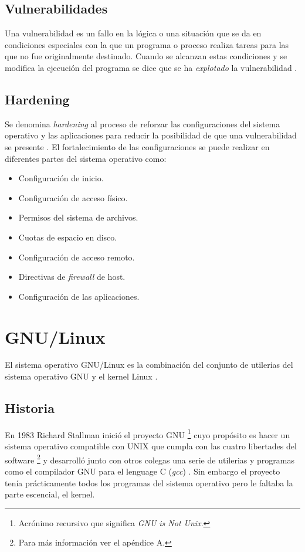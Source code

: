   \subsection {Vulnerabilidades}

Una vulnerabilidad es un fallo en la l\'{o}gica o una situaci\'{o}n que se da en condiciones especiales con la que un programa o proceso realiza tareas para las que no fue originalmente destinado. Cuando se alcanzan estas condiciones y se modifica la ejecuci\'{o}n del programa se dice que se ha \textit{explotado} la vulnerabilidad \cite{padilla_buenas_2009}.

  \subsection {Hardening}

Se denomina \textit{hardening} al proceso de reforzar las configuraciones del sistema operativo y las aplicaciones para reducir la posibilidad de que una vulnerabilidad se presente \cite{padilla_buenas_2009}. El fortalecimiento de las configuraciones se puede realizar en diferentes partes del sistema operativo como:

\begin{itemize}
  \item Configuraci\'{o}n de inicio.
  \item Configuraci\'{o}n de acceso f\'{i}sico.
  \item Permisos del sistema de archivos.
  \item Cuotas de espacio en disco.
  \item Configuraci\'{o}n de acceso remoto.
  \item Directivas de \textit{firewall} de host.
  \item Configuraci\'{o}n de las aplicaciones.
\end{itemize}

\section {GNU/Linux}

El sistema operativo GNU/Linux es la combinaci\'{o}n del conjunto de utilerias del sistema operativo GNU y el kernel Linux \cite{_linux_????}.

  \subsection {Historia}

En 1983 Richard Stallman inici\'{o} el proyecto \textsc{GNU} \footnote{Acr\'{o}nimo recursivo que significa \textit{GNU is Not Unix}.} cuyo prop\'{o}sito es hacer un sistema operativo compatible con \textsc{UNIX} que cumpla con las cuatro libertades del software \footnote{Para m\'{a}s informaci\'{o}n ver el ap\'{e}ndice A.} y desarroll\'{o} junto con otros colegas una serie de utilerias y programas como el compilador \textsc{GNU} para el lenguage \textsc{C} (\textit{gcc}) \cite{_about_????}. Sin embargo el proyecto ten\'{i}a pr\'{a}cticamente todos los programas del sistema operativo pero le faltaba la parte escencial, el kernel.

